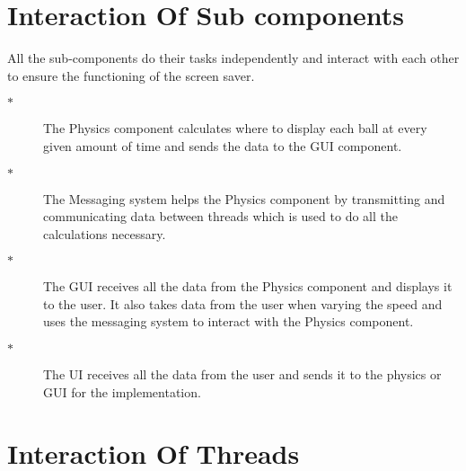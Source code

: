 \documentclass[a4paper]{article}
\begin{document}
\section{Interaction Of Sub components}
All the sub-components do their tasks independently and interact with each other to ensure the functioning of the screen saver. 
\begin{description}
\item[$\ast$ ] The Physics component calculates where to display each ball at every given amount of time and sends the data to the GUI component.
\item[$\ast$ ] The Messaging system helps the Physics component by transmitting and communicating data between threads which is used to do all the calculations necessary.
\item[$\ast$ ] The GUI receives all the data from the Physics component and displays it to the user. It also takes data from the user when varying the speed and uses the messaging system to interact with the Physics component. 
\item[$\ast$ ] The UI receives all the data from the user and sends it to the physics or GUI for the implementation.
\end{description}

\section{Interaction Of Threads}
\end{document}

